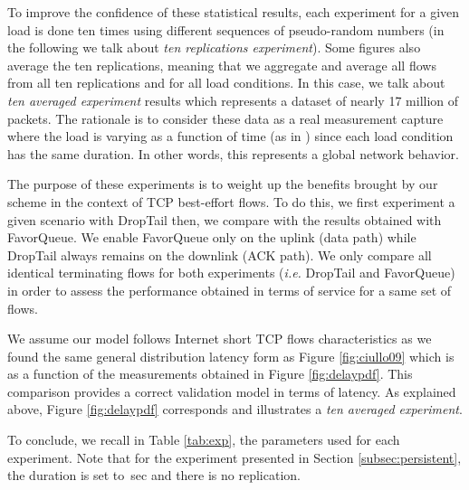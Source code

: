 \documentclass{elsart}
\begin{document}
To improve the confidence of these statistical results, each experiment for a given load is done ten times using different sequences of pseudo-random numbers (in the following we talk about \textit{ten replications experiment}). Some figures also average the ten replications, meaning that we aggregate and average all flows from all ten replications and for all load conditions.
In this case, we talk about \textit{ten averaged experiment} results which represents a dataset of nearly 17 million of packets. The rationale is to consider these data as a real measurement capture where the load is varying as a function of time (as in \cite{ciullo09}) since each load condition has the same duration. In other words, this represents a global network behavior. 

The purpose of these experiments is to weight up the benefits brought by our scheme in the context of TCP best-effort flows. To do this, we first experiment a given scenario with DropTail then, we compare with the results obtained with FavorQueue. We enable FavorQueue only on the uplink (data path) while DropTail always remains on the downlink (ACK path).
We only compare all identical terminating flows for both experiments (\textit{i.e.} DropTail and FavorQueue) in order to assess the performance obtained in terms of service for a same set of flows.

We assume our model follows Internet short TCP flows characteristics as we found the same general distribution latency form as Figure \ref{fig:ciullo09} which is as a function of the measurements obtained in Figure \ref{fig:delaypdf}. This comparison provides a correct validation model in terms of latency. As explained above, Figure \ref{fig:delaypdf} corresponds and illustrates a \textit{ten averaged experiment}. 

To conclude, we recall in Table \ref{tab:exp}, the parameters used for each experiment. Note that for the experiment presented in Section \ref{subsec:persistent}, the duration is set to \,sec and there is no replication.
\end{document}
